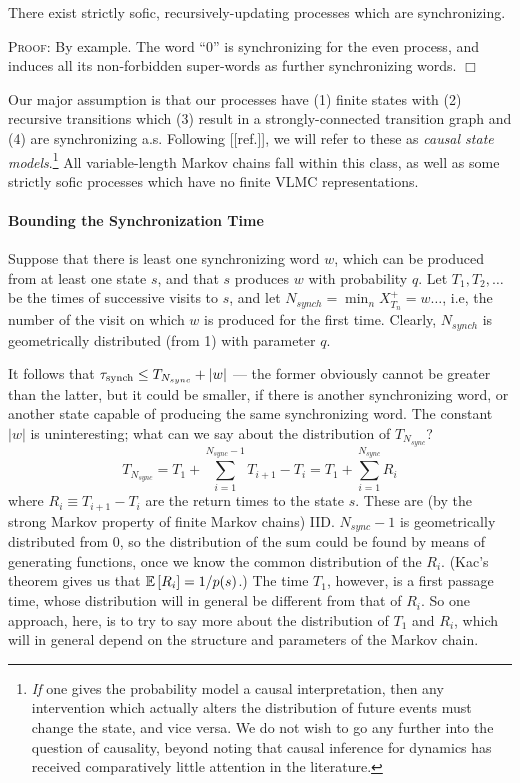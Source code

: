 \documentclass[../new-procedure.tex]{subfiles}
\begin{document}
\begin{proposition}
  There exist strictly sofic, recursively-updating processes which are
  synchronizing.
\end{proposition}

\textsc{Proof}: By example.  The word ``0'' is synchronizing for the even
process, and induces all its non-forbidden super-words as further synchronizing
words. $\Box$


Our major assumption is that our processes have (1) finite states with (2)
recursive transitions which (3) result in a strongly-connected transition graph
and (4) are synchronizing a.s.  Following [[ref.]], we will refer to these as
{\em causal state models}.\footnote{{\em If} one gives the probability model a
  causal interpretation, then any intervention which actually alters the
  distribution of future events must change the state, and vice versa.  We do
  not wish to go any further into the question of causality, beyond noting that
  causal inference for dynamics has received comparatively little attention in
  the literature.}  All variable-length Markov chains fall within this class,
as well as some strictly sofic processes which have no finite VLMC
representations.

\paragraph{Bounding the Synchronization Time}

Suppose that there is least one synchronizing word $w$, which can be produced
from at least one state $s$, and that $s$ produces $w$ with probability $q$.
Let $T_1, T_2, \ldots$ be the times of successive visits to $s$, and let
$N_{synch} = \min_{n}{X_{T_n}^{+}= w\ldots}$, i.e, the number of the visit on
which $w$ is produced for the first time.  Clearly, $N_{synch}$ is
geometrically distributed (from 1) with parameter $q$.

It follows that $\tau_{\mathrm{synch}} \leq T_{N_{sync}} + |w|$ --- the former obviously
cannot be greater than the latter, but it could be smaller, if there is
another synchronizing word, or another state capable of producing the same
synchronizing word.  The constant $|w|$ is uninteresting; what can we say
about the distribution of $T_{N_{sync}}$?
\begin{equation}
T_{N_{sync}} = T_1 + \sum_{i=1}^{N_{sync} - 1}{T_{i+1} - T_{i}} = T_1 + \sum_{i=1}^{N_{sync}}{R_i}
\end{equation}
where $R_i \equiv T_{i+1} - T_{i}$ are the return times to the state $s$.
These are (by the strong Markov property of finite Markov chains) IID.
$N_{sync} - 1$ is geometrically distributed from 0, so the distribution of the
sum could be found by means of generating functions, once we know the common
distribution of the $R_i$.  (Kac's theorem gives us that $\mathbb{E}\left[ R_i \right] =
1/p(s)$.) The time $T_1$, however, is a first passage time, whose distribution
will in general be different from that of $R_i$.  So one approach, here, is to
try to say more about the distribution of $T_1$ and $R_i$, which will in
general depend on the structure and parameters of the Markov chain.
\end{document}
